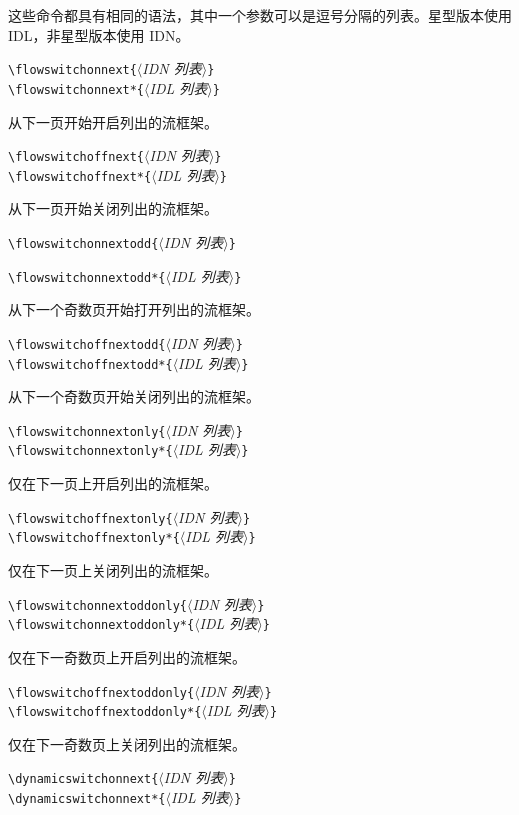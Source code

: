 \documentclass[a4paper]{book}%
\newcommand{\meta}[1]{\textnormal{\ensuremath{\langle}\makebox[0pt][l]{}\emph{#1}\makebox[0pt][l]{}\ensuremath{\rangle}}}
\begin{document}
这些命令都具有相同的语法，其中一个参数可以是逗号分隔的列表。星型版本使用 IDL，非星型版本使用 IDN。
\begin{mdframed}
    \verb|\flowswitchonnext{|\meta{IDN 列表}\verb|}|\\
    \verb|\flowswitchonnext*{|\meta{IDL 列表}\verb|}|
\end{mdframed}
从下一页开始开启列出的流框架。
\begin{mdframed}
    \verb|\flowswitchoffnext{|\meta{IDN 列表}\verb|}|\\
    \verb|\flowswitchoffnext*{|\meta{IDL 列表}\verb|}|
\end{mdframed}
从下一页开始关闭列出的流框架。
\begin{mdframed}
    \verb|\flowswitchonnextodd{|\meta{IDN 列表}\verb|}|
\end{mdframed}\newpage
\begin{mdframed}
    \verb|\flowswitchonnextodd*{|\meta{IDL 列表}\verb|}|
\end{mdframed}
从下一个奇数页开始打开列出的流框架。
\begin{mdframed}
    \verb|\flowswitchoffnextodd{|\meta{IDN 列表}\verb|}|\\
    \verb|\flowswitchoffnextodd*{|\meta{IDL 列表}\verb|}|
\end{mdframed}
从下一个奇数页开始关闭列出的流框架。
\begin{mdframed}
    \verb|\flowswitchonnextonly{|\meta{IDN 列表}\verb|}|\\
    \verb|\flowswitchonnextonly*{|\meta{IDL 列表}\verb|}|
\end{mdframed}
仅在下一页上开启列出的流框架。
\begin{mdframed}
    \verb|\flowswitchoffnextonly{|\meta{IDN 列表}\verb|}|\\
    \verb|\flowswitchoffnextonly*{|\meta{IDL 列表}\verb|}|
\end{mdframed}
仅在下一页上关闭列出的流框架。
\begin{mdframed}
    \verb|\flowswitchonnextoddonly{|\meta{IDN 列表}\verb|}|\\
    \verb|\flowswitchonnextoddonly*{|\meta{IDL 列表}\verb|}|
\end{mdframed}
仅在下一奇数页上开启列出的流框架。
\begin{mdframed}
    \verb|\flowswitchoffnextoddonly{|\meta{IDN 列表}\verb|}|\\
    \verb|\flowswitchoffnextoddonly*{|\meta{IDL 列表}\verb|}|
\end{mdframed}
仅在下一奇数页上关闭列出的流框架。
\begin{mdframed}
    \verb|\dynamicswitchonnext{|\meta{IDN 列表}\verb|}|\\
    \verb|\dynamicswitchonnext*{|\meta{IDL 列表}\verb|}|
\end{mdframed}
\end{document}
